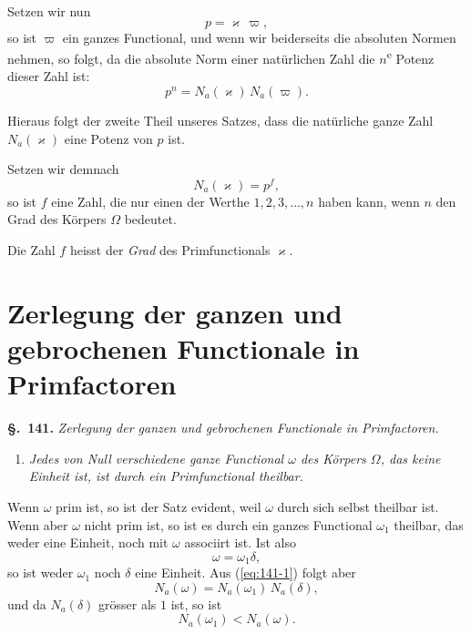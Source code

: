 \documentclass[12pt,a4paper]{article}
\theoremstyle{definition}
\begin{document}
Setzen wir nun
\begin{equation}\label{eq:140-1}
p = \varkappa\,\varpi,
\end{equation}
so ist $\varpi$ ein ganzes Functional, und wenn wir beiderseits die absoluten Normen nehmen, so folgt, da die absolute Norm einer natürlichen Zahl die $n$\textsuperscript{e} Potenz dieser Zahl ist:
\begin{equation}\label{eq:140-2}
p^n = N_a(\varkappa)\,N_a(\varpi).
\end{equation}

Hieraus folgt der zweite Theil unseres Satzes, dass die natürliche ganze Zahl $N_a(\varkappa)$ eine Potenz von $p$ ist.

Setzen wir demnach
\begin{equation}\label{eq:140-3}
N_a(\varkappa) = p^f,
\end{equation}
so ist $f$ eine Zahl, die nur einen der Werthe $1,2,3,\dots,n$ haben kann, wenn $n$ den Grad des Körpers $\Omega$ bedeutet.

Die Zahl $f$ heisst der \emph{Grad} des Primfunctionals $\varkappa$.

\newpage
\section[Zerlegung der ganzen und gebrochenen Functionale in Primfactoren]%
        {Zerlegung der ganzen und gebrochenen Functionale in Primfactoren}\label{sec:141}

\noindent\textbf{\S.~141.}\quad
\textit{Zerlegung der ganzen und gebrochenen Functionale in Primfactoren.}\par\medskip

\begin{enumerate}[label=\arabic*.]
\item \textit{Jedes von Null verschiedene ganze Functional $\omega$ des Körpers $\Omega$, das keine Einheit ist, ist durch ein Primfunctional theilbar.}
\end{enumerate}

Wenn $\omega$ prim ist, so ist der Satz evident, weil $\omega$ durch sich selbst theilbar ist. Wenn aber $\omega$ nicht prim ist, so ist es durch ein ganzes Functional $\omega_1$ theilbar, das weder eine Einheit, noch mit $\omega$ associirt ist. Ist also
\begin{equation}\label{eq:141-1}
\omega = \omega_1\delta,
\end{equation}
so ist weder $\omega_1$ noch $\delta$ eine Einheit. Aus (\ref{eq:141-1}) folgt aber
\[
N_a(\omega) = N_a(\omega_1)\,N_a(\delta),
\]
und da $N_a(\delta)$ grösser als $1$ ist, so ist
\begin{equation}\label{eq:141-2}
N_a(\omega_1) < N_a(\omega).
\end{equation}
\end{document}
